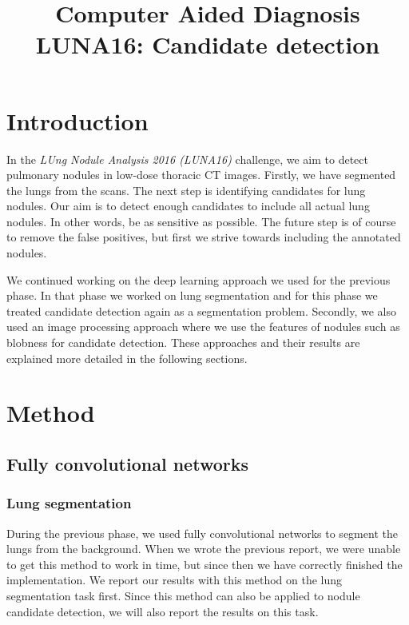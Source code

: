 \documentclass{article}
\title{Computer Aided Diagnosis\\LUNA16: Candidate detection}
\begin{document}
%
\maketitle
%


\section{Introduction}
\label{sec:intro}
In the \emph{LUng Nodule Analysis 2016 (LUNA16)} challenge, we aim to detect pulmonary nodules in low-dose thoracic CT images. Firstly, we have segmented the lungs from the scans. The next step is identifying candidates for lung nodules. Our aim is to detect enough candidates to include all actual lung nodules. In other words, be as sensitive as possible. The future step is of course to remove the false positives, but first we strive towards including the annotated nodules.

We continued working on the deep learning approach we used for the previous phase. In that phase we worked on lung segmentation and for this phase we treated candidate detection again as a segmentation problem. Secondly, we also used an image processing approach where we use the features of nodules such as blobness for candidate detection. These approaches and their results are explained more detailed in the following sections.

\section{Method}\label{sec:method}

\subsection{Fully convolutional networks}
\subsubsection{Lung segmentation}
During the previous phase, we used fully convolutional networks \cite{long} to segment the lungs from the background. When we wrote the previous report, we were unable to get this method to work in time, but since then we have correctly finished the implementation. We report our results with this method on the lung segmentation task first. Since this method can also be applied to nodule candidate detection, we will also report the results on this task.
\end{document}

